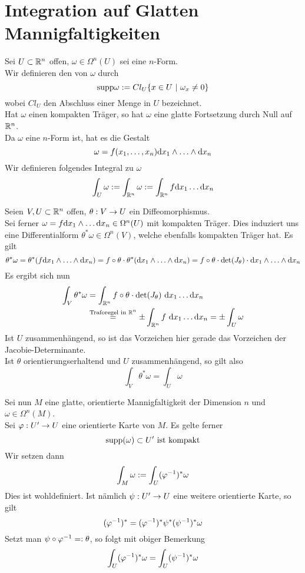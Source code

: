 \section{Integration auf Glatten Mannigfaltigkeiten}

\Def{}
Sei $U \subset \mathbb{R}^n$ offen, $\omega \in \Omega^n(U)$ sei eine $n$-Form.\\
Wir definieren den  von $\omega$ durch
\[ \supp \omega := Cl_U{\set{x \in U}{\omega_x \neq 0}} \]
wobei $Cl_U$ den Abschluss einer Menge in $U$ bezeichnet.\\
Hat $\omega$ einen kompakten Träger, so hat $\omega$ eine glatte Fortsetzung durch Null auf $\mathbb{R}^n$.\\
Da $\omega$ eine $n$-Form ist, hat es die Gestalt
\[ \omega = f(x_1, \ldots, x_n) \text{d} x_1 \wedge \ldots \wedge \text{d} x_n \]
Wir definieren folgendes Integral zu $\omega$
\[ \int_U \omega := \int_{\mathbb{R}^n}\omega := \int_{\mathbb{R}^n} f \text{d} x_1 \ldots \text{d} x_n \]

\Bem{}
Seien $V,U \subset \mathbb{R}^n$ offen, $\theta : V \overset{}{\rightarrow} U$ ein Diffeomorphismus.\\
Sei ferner $\omega = f \text{d} x_1 \wedge \ldots \text{d} x_n\in \Omega^n(U)$ mit kompakten Träger. Dies induziert uns eine Differentialform $\theta^*\omega \in \Omega^n(V)$, welche ebenfalls kompakten Träger hat. Es gilt
\[ \theta^*\omega= \theta^*(f\text{d} x_1 \wedge \ldots \wedge \text{d} x_n) = f\circ \theta \cdot \theta^*(\text{d} x_1 \wedge \ldots \wedge \text{d} x_n) = f\circ \theta \cdot \det(J_\theta) \cdot \text{d} x_1 \wedge \ldots \wedge \text{d} x_n \]
Es ergibt sich nun
\begin{align*}
\int_V \theta^*\omega &= \int_{\mathbb{R}^n} f\circ \theta \cdot \det(J_\theta)~ \text{d} x_1 \ldots \text{d} x_n\\
&\overset{\text{Traforegel in }\mathbb{R}^n}{=} \pm \int_{\mathbb{R}^n} f~ \text{d} x_1 \ldots \text{d} x_n = \pm \int_U \omega
\end{align*}
Ist $U$ zusammenhängend, so ist das Vorzeichen hier gerade das Vorzeichen der Jacobie-Determinante.\\
Ist $\theta$ orientierungserhaltend und $U$ zusammenhängend, so gilt also
\[ \int_V \theta^*\omega = \int_U \omega \]

\Def{}
Sei nun $M$ eine glatte, orientierte Mannigfaltigkeit der Dimension $n$ und $\omega \in \Omega^n(M)$.\\
Sei $\varphi : U' \overset{}{\rightarrow} U$ eine orientierte Karte von $M$. Es gelte ferner
\[ \text{supp}(\omega) \subset U' \text{ ist kompakt} \]
Wir setzen dann
\[ \int_M  \omega := \int_U (\varphi^{-1})^*\omega \]
Dies ist wohldefiniert. Ist nämlich $\psi : U' \overset{}{\rightarrow} U$ eine weitere orientierte Karte, so gilt
\[ (\varphi^{-1})^* = (\varphi^{-1})^*\psi^* (\psi^{-1})^* \omega \]
Setzt man $\psi \circ \varphi^{-1} =: \theta$, so folgt mit obiger Bemerkung
\[ \int_U (\varphi^{-1})^*\omega = \int_U (\psi^{-1})^*\omega \]

